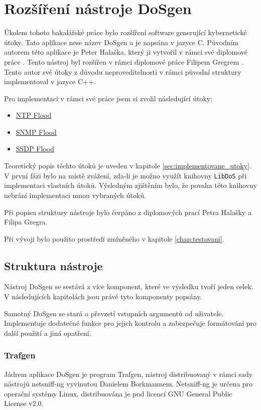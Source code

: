 \chapter{Rozšíření nástroje DoSgen}
Úkolem tohoto bakalářské práce bylo rozšíření software generující kybernetické útoky. Tato aplikace nese název DoSgen a je napsána v jazyce C. Původním autorem této aplikace je Peter Halaška, který ji vytvořil v rámci své diplomové práce \cite{Halaska2016}. Tento nástroj byl rozšířen v rámci diplomové práce Filipem Gregrem \cite{Gregr2017}. Tento autor své útoky z důvodu neproveditelnosti v rámci původní struktury implementoval v jazyce C++.

Pro implementaci v rámci své práce jsem si zvolil následující útoky:
\begin{itemize}
	\item{\hyperref[subsec:ntp_flood]{NTP Flood}}
	\item{\hyperref[subsec:snmp_flood]{SNMP Flood}}
	\item{\hyperref[subsec:ssdp_flood]{SSDP Flood}}
\end{itemize}

Teoretický popis těchto útoků je uveden v kapitole \ref{sec:implementovane_utoky}. V první fázi bylo na místě zvážení, zda-li je možno využít knihovny \texttt{LibDoS} při implementaci vlastních útoků. Výsledným zjištěním bylo, že povaha této knihovny nebrání implementaci mnou vybraných útoků.

Při popisu struktury nástroje bylo čerpáno z diplomových prací Petra Halašky a Filipa Gregra.

Při vývoji bylo použito prostředí zmíněného v kapitole \ref{chap:testovani}.

\section{Struktura nástroje}
Nástroj DoSgen se sestává z více komponent, které ve výsledku tvoří jeden celek. V následujících kapitolách jsou právě tyto komponenty popsány.

Samotný DoSgen se stará o převzetí vstupních argumentů od uživatele. Implementuje dodatečné funkce pro jejich kontrolu a zabezpečuje formátování pro další použití a jiná opatření.

\subsection{Trafgen}
Jádrem aplikace DoSgen je program Trafgen, nástroj distribuovaný v rámci sady nástrojů netsniff-ng vyvinutou Danielem Borkmannem. Netsniff-ng je určena pro operační systémy Linux, distribuována je pod licencí GNU General Public License v2.0.

